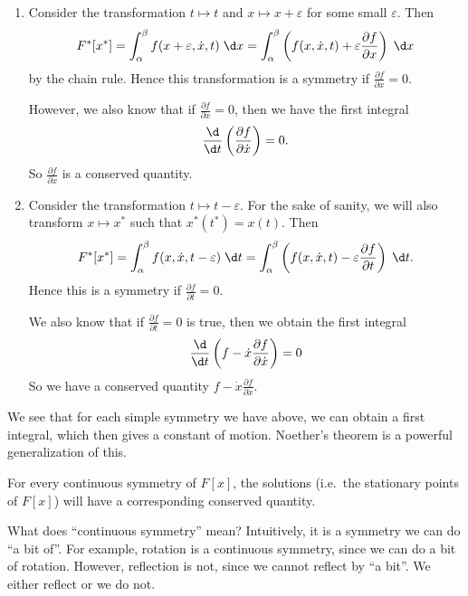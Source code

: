\documentclass[a4paper]{article}
\begin{document}
\begin{eg}\leavevmode
  \begin{enumerate}
    \item Consider the transformation $t \mapsto t$ and $x \mapsto x + \varepsilon$ for some small $\varepsilon$. Then
      \[
        F^*[x^*] = \int_\alpha^\beta f(x + \varepsilon, \dot{x}, t)\;\d x = \int_\alpha^\beta \left(f(x, \dot{x}, t) + \varepsilon \frac{\partial f}{\partial x}\right)\;\d x
      \]
      by the chain rule. Hence this transformation is a symmetry if $\frac{\partial f}{\partial x} = 0$.

      However, we also know that if $\frac{\partial f}{\partial x} = 0$, then we have the first integral
      \[
        \frac{\d}{\d t}\left(\frac{\partial f}{\partial \dot{x}}\right) = 0.
      \]
      So $\frac{\partial f}{\partial \dot{x}}$ is a conserved quantity.
    \item Consider the transformation $t \mapsto t - \varepsilon$. For the sake of sanity, we will also transform $x\mapsto x^*$ such that $x^*(t^*) = x(t)$. Then
      \[
        F^*[x^*] = \int_\alpha^\beta f(x, \dot{x}, t - \varepsilon)\;\d t = \int_\alpha^\beta \left(f(x, \dot{x}, t) - \varepsilon \frac{\partial f}{\partial t}\right)\;\d t.
      \]
      Hence this is a symmetry if $\frac{\partial f}{\partial t} = 0$.

      We also know that if $\frac{\partial f}{\partial t} = 0$ is true, then we obtain the first integral
      \[
        \frac{\d}{\d t}\left(f - \dot{x}\frac{\partial f}{\partial \dot{x}}\right) = 0
      \]
      So we have a conserved quantity $f - \dot{x}\frac{\partial f}{\partial \dot{x}}$.
  \end{enumerate}
\end{eg}
We see that for each simple symmetry we have above, we can obtain a first integral, which then gives a constant of motion. Noether's theorem is a powerful generalization of this.

\begin{thm}
  For every continuous symmetry of $F[x]$, the solutions (i.e.\ the stationary points of $F[x]$) will have a corresponding conserved quantity.
\end{thm}
What does ``continuous symmetry'' mean? Intuitively, it is a symmetry we can do ``a bit of''. For example, rotation is a continuous symmetry, since we can do a bit of rotation. However, reflection is not, since we cannot reflect by ``a bit''. We either reflect or we do not.
\end{document}
